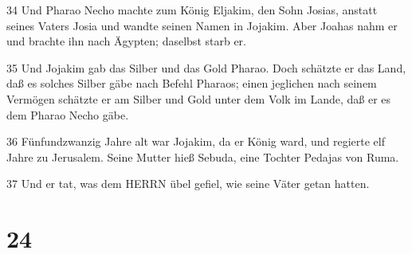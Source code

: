 \par 34 Und Pharao Necho machte zum König Eljakim, den Sohn Josias, anstatt seines Vaters Josia und wandte seinen Namen in Jojakim. Aber Joahas nahm er und brachte ihn nach Ägypten; daselbst starb er.
\par 35 Und Jojakim gab das Silber und das Gold Pharao. Doch schätzte er das Land, daß es solches Silber gäbe nach Befehl Pharaos; einen jeglichen nach seinem Vermögen schätzte er am Silber und Gold unter dem Volk im Lande, daß er es dem Pharao Necho gäbe.
\par 36 Fünfundzwanzig Jahre alt war Jojakim, da er König ward, und regierte elf Jahre zu Jerusalem. Seine Mutter hieß Sebuda, eine Tochter Pedajas von Ruma.
\par 37 Und er tat, was dem HERRN übel gefiel, wie seine Väter getan hatten.

\chapter{24}

